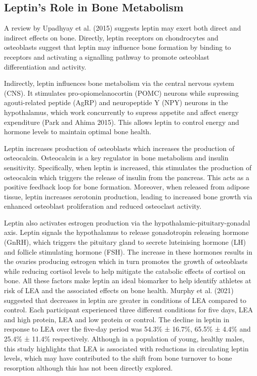 \documentclass[
]{article}
\begin{document}
\subsection{Leptin's Role in Bone Metabolism}\label{leptins-role-in-bone-metabolism}

A review by Upadhyay et al. (2015) suggests leptin may exert both direct and indirect effects on bone. Directly, leptin receptors on chondrocytes and osteoblasts suggest that leptin may influence bone formation by binding to receptors and activating a signalling pathway to promote osteoblast differentiation and activity.

Indirectly, leptin influences bone metabolism via the central nervous system (CNS). It stimulates pro-opiomelanocortin (POMC) neurons while supressing agouti-related peptide (AgRP) and neuropeptide Y (NPY) neurons in the hypothalamus, which work concurrently to supress appetite and affect energy expenditure (Park and Ahima 2015). This allows leptin to control energy and hormone levels to maintain optimal bone health.

Leptin increases production of osteoblasts which increases the production of osteocalcin. Osteocalcin is a key regulator in bone metabolism and insulin sensitivity. Specifically, when leptin is increased, this stimulates the production of osteocalcin which triggers the release of insulin from the pancreas. This acts as a positive feedback loop for bone formation. Moreover, when released from adipose tissue, leptin increases serotonin production, leading to increased bone growth via enhanced osteoblast proliferation and reduced osteoclast activity.

Leptin also activates estrogen production via the hypothalamic-pituitary-gonadal axis. Leptin signals the hypothalamus to release gonadotropin releasing hormone (GnRH), which triggers the pituitary gland to secrete luteinising hormone (LH) and follicle stimulating hormone (FSH). The increase in these hormones results in the ovaries producing estrogen which in turn promotes the growth of osteoblasts while reducing cortisol levels to help mitigate the catabolic effects of cortisol on bone. All these factors make leptin an ideal biomarker to help identify athletes at risk of LEA and the associated effects on bone health. Murphy et al. (2021) suggested that decreases in leptin are greater in conditions of LEA compared to control. Each participant experienced three different conditions for five days, LEA and high protein, LEA and low protein or control. The decline in leptin in response to LEA over the five-day period was 54.3\% ± 16.7\%, 65.5\% ± 4.4\% and 25.4\% ± 11.4\% respectively. Although in a population of young, healthy males, this study highlights that LEA is associated with reductions in circulating leptin levels, which may have contributed to the shift from bone turnover to bone resorption although this has not been directly explored.
\end{document}
